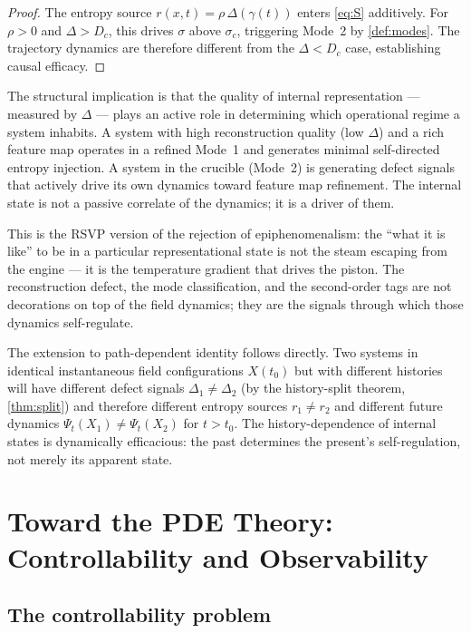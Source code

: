 \documentclass[12pt, oneside]{memoir}
\begin{document}
\begin{proof}
The entropy source $r(x,t) = \rho\,\Delta(\gamma(t))$ enters \cref{eq:S} additively.
For $\rho > 0$ and $\Delta > D_c$, this drives $\sigma$ above $\sigma_c$, triggering
Mode~2 by \cref{def:modes}.  The trajectory dynamics are therefore different from the
$\Delta < D_c$ case, establishing causal efficacy.
\end{proof}

The structural implication is that the quality of internal representation — measured by
$\Delta$ — plays an active role in determining which operational regime a system inhabits.
A system with high reconstruction quality (low $\Delta$) and a rich feature map operates
in a refined Mode~1 and generates minimal self-directed entropy injection.  A system in
the crucible (Mode~2) is generating defect signals that actively drive its own dynamics
toward feature map refinement.  The internal state is not a passive correlate of the
dynamics; it is a driver of them.

This is the RSVP version of the rejection of epiphenomenalism: the ``what it is like''
to be in a particular representational state is not the steam escaping from the engine
— it is the temperature gradient that drives the piston.  The reconstruction defect,
the mode classification, and the second-order tags are not decorations on top of the
field dynamics; they are the signals through which those dynamics self-regulate.

The extension to path-dependent identity follows directly.  Two systems in identical
instantaneous field configurations $X(t_0)$ but with different histories will have
different defect signals $\Delta_1 \neq \Delta_2$ (by the history-split theorem,
\cref{thm:split}) and therefore different entropy sources $r_1 \neq r_2$ and different
future dynamics $\Psi_t(X_1) \neq \Psi_t(X_2)$ for $t > t_0$.  The history-dependence
of internal states is dynamically efficacious: the past determines the present's
self-regulation, not merely its apparent state.

\chapter{Toward the PDE Theory: Controllability and Observability}
\label{ch:pde-theory}

\section{The controllability problem}
\end{document}

